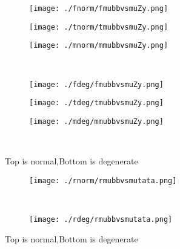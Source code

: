 \documentclass[aps,floats,floatfix,nofootinbib]{revtex4-1}
\begin{document}
\begin{center}
\begin{figure}
\begin{subfigure}{0.3\textwidth}
\texttt{[image: ./fnorm/fmubbvsmuZy.png]}
\label{}
\end{subfigure}
\begin{subfigure}{0.3\textwidth}
\texttt{[image: ./tnorm/tmubbvsmuZy.png]}
\label{}
\end{subfigure}
\begin{subfigure}{0.3\textwidth}
\texttt{[image: ./mnorm/mmubbvsmuZy.png]}
\label{}
\end{subfigure}\\
\begin{subfigure}{0.3\textwidth}
\texttt{[image: ./fdeg/fmubbvsmuZy.png]}
\label{}
\end{subfigure}
\begin{subfigure}{0.3\textwidth}
\texttt{[image: ./tdeg/tmubbvsmuZy.png]}
\label{}
\end{subfigure}
\begin{subfigure}{0.3\textwidth}
\texttt{[image: ./mdeg/mmubbvsmuZy.png]}
\label{}
\end{subfigure}\\
\caption{Top is normal,Bottom is degenerate}
\end{figure}
\end{center}

\begin{center}
\begin{figure}
\begin{subfigure}{0.95\textwidth}
\texttt{[image: ./rnorm/rmubbvsmutata.png]}
\label{}
\end{subfigure}\\
\begin{subfigure}{0.95\textwidth}
\texttt{[image: ./rdeg/rmubbvsmutata.png]}
\label{}
\end{subfigure}
\caption{Top is normal,Bottom is degenerate}
\end{figure}
\end{center}
\end{document}
